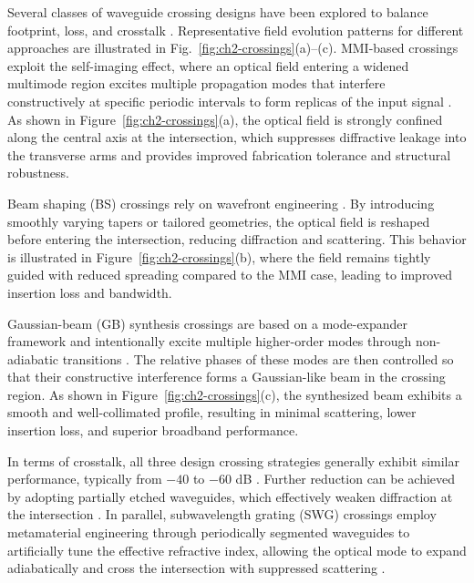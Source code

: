 Several classes of waveguide crossing designs have been explored to balance footprint, loss, and crosstalk \cite{wu2020crossingstate}.
Representative field evolution patterns for different approaches are illustrated in Fig.~\ref{fig:ch2-crossings}(a)--(c).
MMI-based crossings exploit the self-imaging effect, where an optical field entering a widened multimode region excites multiple propagation modes that interfere constructively at specific periodic intervals to form replicas of the input signal \cite{chen2006low}.
As shown in Figure~\ref{fig:ch2-crossings}(a), the optical field is strongly confined along the central axis at the intersection, which suppresses diffractive leakage into the transverse arms and provides improved fabrication tolerance and structural robustness.

Beam shaping (BS) crossings rely on wavefront engineering \cite{sakamaki2009loss, chandran2020beam}.
By introducing smoothly varying tapers or tailored geometries, the optical field is reshaped before entering the intersection, reducing diffraction and scattering.
This behavior is illustrated in Figure~\ref{fig:ch2-crossings}(b), where the field remains tightly guided with reduced spreading compared to the MMI case, leading to improved insertion loss and bandwidth.

Gaussian-beam (GB) synthesis crossings are based on a mode-expander framework and intentionally excite multiple higher-order modes through non-adiabatic transitions \cite{dumais2017three}.
The relative phases of these modes are then controlled so that their constructive interference forms a Gaussian-like beam in the crossing region.
As shown in Figure~\ref{fig:ch2-crossings}(c), the synthesized beam exhibits a smooth and well-collimated profile, resulting in minimal scattering, lower insertion loss, and superior broadband performance.

In terms of crosstalk, all three design crossing strategies generally exhibit similar performance, typically from $-40$ to $-60$ dB \cite{gomez-hidalgoFundamentalBuildingBlocksa}.
Further reduction can be achieved by adopting partially etched waveguides, which effectively weaken diffraction at the intersection \cite{shih2022partial}.
In parallel, subwavelength grating (SWG) crossings employ metamaterial engineering through periodically segmented waveguides to artificially tune the effective refractive index, allowing the optical mode to expand adiabatically and cross the intersection with suppressed scattering \cite{bock2010subwavelength, ni2023compact}.

